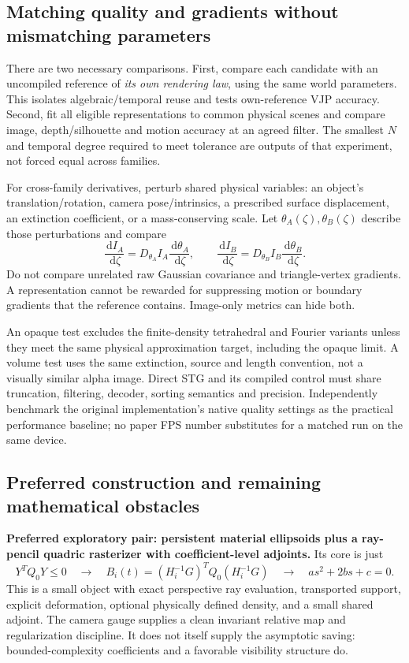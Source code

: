 \documentclass[10pt,letterpaper]{article}
\theoremstyle{remark}\newtheorem{counterexample}[proposition]{Counterexample}
\newcommand{\dd}{\,\mathrm d}
\begin{document}
\subsection{Matching quality and gradients without mismatching parameters}
There are two necessary comparisons. First, compare each candidate with an uncompiled reference of \emph{its own rendering law}, using the same world parameters. This isolates algebraic/temporal reuse and tests own-reference VJP accuracy. Second, fit all eligible representations to common physical scenes and compare image, depth/silhouette and motion accuracy at an agreed filter. The smallest $N$ and temporal degree required to meet tolerance are outputs of that experiment, not forced equal across families.

For cross-family derivatives, perturb shared physical variables: an object's translation/rotation, camera pose/intrinsics, a prescribed surface displacement, an extinction coefficient, or a mass-conserving scale. Let $\theta_A(\zeta),\theta_B(\zeta)$ describe those perturbations and compare
\begin{equation}
 \frac{\dd I_A}{\dd\zeta}=D_{\theta_A}I_A\frac{\dd\theta_A}{\dd\zeta},\qquad
 \frac{\dd I_B}{\dd\zeta}=D_{\theta_B}I_B\frac{\dd\theta_B}{\dd\zeta}.
\end{equation}
Do not compare unrelated raw Gaussian covariance and triangle-vertex gradients. A representation cannot be rewarded for suppressing motion or boundary gradients that the reference contains. Image-only metrics can hide both.

An opaque test excludes the finite-density tetrahedral and Fourier variants unless they meet the same physical approximation target, including the opaque limit. A volume test uses the same extinction, source and length convention, not a visually similar alpha image. Direct STG and its compiled control must share truncation, filtering, decoder, sorting semantics and precision. Independently benchmark the original implementation's native quality settings as the practical performance baseline; no paper FPS number substitutes for a matched run on the same device.

\subsection{Preferred construction and remaining mathematical obstacles}
\textbf{Preferred exploratory pair: persistent material ellipsoids plus a ray-pencil quadric rasterizer with coefficient-level adjoints.} Its core is just
\begin{equation}
 Y^TQ_0Y\leq0\quad\longrightarrow\quad
 B_i(t)=(H_i^{-1}G)^TQ_0(H_i^{-1}G)\quad\longrightarrow\quad
 as^2+2bs+c=0.
\end{equation}
This is a small object with exact perspective ray evaluation, transported support, explicit deformation, optional physically defined density, and a small shared adjoint. The camera gauge supplies a clean invariant relative map and regularization discipline. It does not itself supply the asymptotic saving: bounded-complexity coefficients and a favorable visibility structure do.
\end{document}
